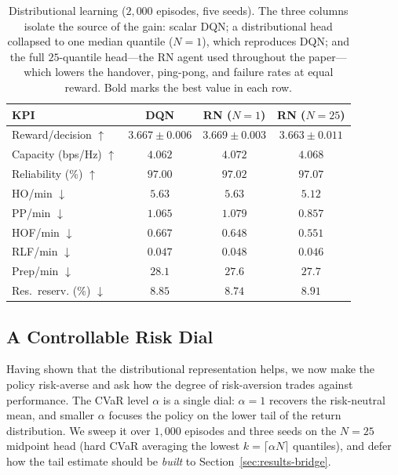 \documentclass[conference]{IEEEtran}
\begin{document}
\begin{table}[htbp]
\caption{Distributional learning ($2{,}000$ episodes, five seeds). The three
columns isolate the source of the gain: scalar DQN; a distributional head
collapsed to one median quantile ($N{=}1$), which reproduces DQN; and the full
$25$-quantile head---the RN agent used throughout the paper---which lowers the
handover, ping-pong, and failure rates at equal reward. Bold marks the best value
in each row.}
\label{tab:dist}
\centering
\begin{tabular}{|l|c|c|c|}
\hline
\textbf{KPI} & \textbf{DQN} & \textbf{RN ($N{=}1$)} & \textbf{RN ($N{=}25$)} \\
\hline
Reward/decision $\uparrow$          & $3.667{\pm}0.006$ & $\mathbf{3.669{\pm}0.003}$ & $3.663{\pm}0.011$ \\
Capacity (bps/Hz) $\uparrow$        & $4.062$ & $\mathbf{4.072}$ & $4.068$ \\
Reliability (\%) $\uparrow$         & $97.00$ & $97.02$ & $\mathbf{97.07}$ \\
HO/min $\downarrow$                 & $5.63$  & $5.63$  & $\mathbf{5.12}$  \\
PP/min $\downarrow$                 & $1.065$ & $1.079$ & $\mathbf{0.857}$ \\
HOF/min $\downarrow$                & $0.667$ & $0.648$ & $\mathbf{0.551}$ \\
RLF/min $\downarrow$                & $0.047$ & $0.048$ & $\mathbf{0.046}$ \\
Prep/min $\downarrow$               & $28.1$  & $\mathbf{27.6}$  & $27.7$  \\
Res.\ reserv. (\%) $\downarrow$ & $8.85$  & $\mathbf{8.74}$  & $8.91$  \\
\hline
\end{tabular}
\end{table}

\subsection{A Controllable Risk Dial}
\label{sec:results-risk}
Having shown that the distributional representation helps, we now make the policy
risk-averse and ask how the degree of risk-aversion trades against performance.
The CVaR level $\alpha$ is a single dial: $\alpha=1$ recovers the risk-neutral
mean, and smaller $\alpha$ focuses the policy on the lower tail of the return
distribution. We sweep it over $1{,}000$ episodes and three seeds on the $N{=}25$
midpoint head (hard CVaR averaging the lowest $k=\lceil\alpha N\rceil$ quantiles),
and defer how the tail estimate should be \emph{built} to
Section~\ref{sec:results-bridge}.
\end{document}
